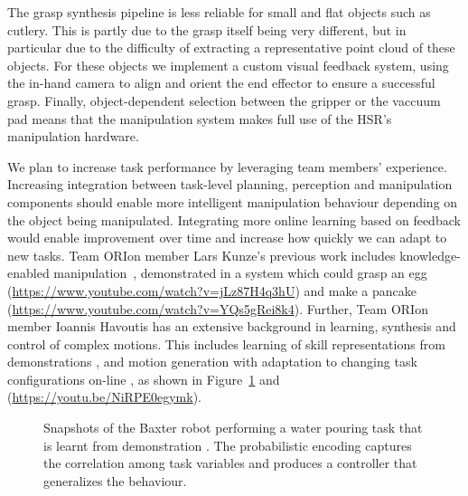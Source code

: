 \documentclass[runningheads,a4paper]{llncs}
\newcommand{\teamori}{Team ORIon}
\begin{document}
The grasp synthesis pipeline is less reliable for small and flat objects such as cutlery.
%
This is partly due to the grasp itself being very different, but in particular due to the difficulty of extracting a representative point cloud of these objects.
%
For these objects we implement a custom visual feedback system, using the in-hand camera to align and orient the end effector to ensure a successful grasp.
%
Finally, object-dependent selection between the gripper or the vaccuum pad means that the manipulation system makes full use of the HSR's manipulation hardware.

We plan to increase task performance by leveraging team members' experience.
%
Increasing integration between task-level planning, perception and manipulation components should enable more intelligent manipulation behaviour depending on the object being manipulated.
%
Integrating more online learning based on feedback would enable improvement over time and increase how quickly we can adapt to new tasks.
%
\teamori{} member Lars Kunze's previous work includes knowledge-enabled manipulation~\cite{kunze15aij}, demonstrated in a system which could grasp an egg (\url{https://www.youtube.com/watch?v=jLz87H4q3hU}) and make a pancake (\url{https://www.youtube.com/watch?v=YQs5gRei8k4}). 
%
Further, \teamori{} member Ioannis Havoutis has an extensive background in learning, synthesis and control of complex motions.
%
This includes learning of skill representations from demonstrations \cite{Havoutis16SSRR,Havoutis17ICRA}, and motion generation with adaptation to changing task configurations on-line \cite{Zeestraten17IROS,Zeestraten2017-RAL}, as shown in  Figure~\ref{fig:baxter_water_task} and (\url{https://youtu.be/NiRPE0egymk}).

\begin{figure}[!t]
	\centering
	\vspace{-10pt}%
	\caption{Snapshots of the Baxter robot performing a water pouring task that
	is learnt from demonstration \cite{Zeestraten2017-RAL}. The probabilistic
	encoding captures the correlation among task variables and produces a
	controller that generalizes the behaviour.}
	\label{fig:baxter_water_task}
	\vspace{-3ex}
\end{figure}
\end{document}
